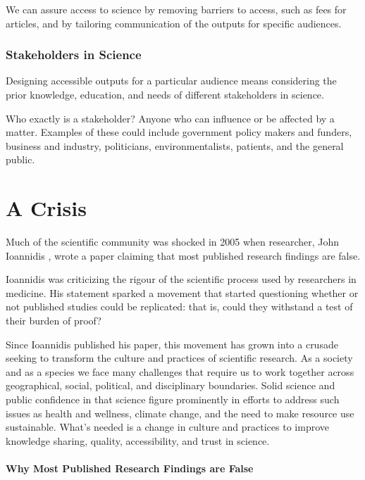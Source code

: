 \documentclass[
]{book}
\begin{document}
We can assure access to science by removing barriers to access, such as fees for articles, and by tailoring communication of the outputs for specific audiences.

\hypertarget{stakeholders-in-science}{%
\subsubsection*{Stakeholders in Science}\label{stakeholders-in-science}}

Designing accessible outputs for a particular audience means considering the prior knowledge, education, and needs of different stakeholders in science.

Who exactly is a stakeholder? Anyone who can influence or be affected by a matter. Examples of these could include government policy makers and funders, business and industry, politicians, environmentalists, patients, and the general public.

\hypertarget{a-crisis}{%
\section{A Crisis}\label{a-crisis}}

Much of the scientific community was shocked in 2005 when researcher, John Ioannidis \citep{ioannidis_why_2005}, wrote a paper claiming that most published research findings are false.

Ioannidis was criticizing the rigour of the scientific process used by researchers in medicine. His statement sparked a movement that started questioning whether or not published studies could be replicated: that is, could they withstand a test of their burden of proof?

Since Ioannidis published his paper, this movement has grown into a crusade seeking to transform the culture and practices of scientific research. As a society and as a species we face many challenges that require us to work together across geographical, social, political, and disciplinary boundaries. Solid science and public confidence in that science figure prominently in efforts to address such issues as health and wellness, climate change, and the need to make resource use sustainable. What's needed is a change in culture and practices to improve knowledge sharing, quality, accessibility, and trust in science.

\hypertarget{why-most-published-research-findings-are-false}{%
\paragraph*{Why Most Published Research Findings are False}\label{why-most-published-research-findings-are-false}}
\end{document}
